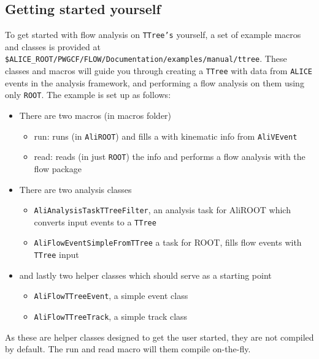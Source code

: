 \documentclass[a4paper]{book}
\numberwithin{equation}{subsection}
\begin{document}
\subsection{Getting started yourself}
To get started with flow analysis on \texttt{TTree's} yourself, a set of example macros and classes is provided at \texttt{\$ALICE\_ROOT/PWGCF/FLOW/Documentation/examples/manual/ttree}. These classes and macros will guide you through creating a \texttt{TTree} with data from \texttt{ALICE} events in the analysis framework, and performing a flow analysis on them using only \texttt{ROOT}. The example is set up as follows:
\begin{itemize}
\item There are two macros (in macros folder)
\begin{itemize}
\item run: runs (in \texttt{AliROOT}) and fills a  with kinematic info from \texttt{AliVEvent}
\item read: reads (in just \texttt{ROOT}) the  info and performs a flow analysis with the flow package
\end{itemize}
\item There are two analysis classes
\begin{itemize}
\item  \texttt{AliAnalysisTaskTTreeFilter}, an analysis task for AliROOT which converts input events to a \texttt{TTree}
\item \texttt{AliFlowEventSimpleFromTTree} a task for ROOT, fills flow events with \texttt{TTree} input
\end{itemize}
\item and lastly two helper classes which should serve as a starting point
\begin{itemize}
\item \texttt{AliFlowTTreeEvent}, a simple event class
\item \texttt{AliFlowTTreeTrack}, a simple track class
\end{itemize}
\end{itemize}
As these are helper classes designed to get the user started, they are not compiled by default. The run and read macro will them compile on-the-fly.
\end{document}
